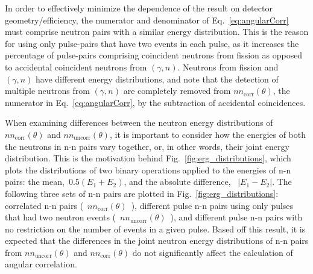 In order to effectively minimize the dependence of the result on detector geometry/efficiency, the numerator and denominator of Eq.~\ref{eq:angularCorr} must comprise neutron pairs with a similar energy distribution.
This is the reason for using only pulse-pairs that have two events in each pulse, as it increases the percentage of pulse-pairs comprising coincident neutrons from fission as opposed to accidental coincident neutrons from $(\gamma,n)$.
Neutrons from fission and $(\gamma,n)$ have different energy distributions, and note that the detection of multiple neutrons from $(\gamma,n)$ are completely removed from $nn_{\text{corr}}(\theta)$, the numerator in Eq.~\ref{eq:angularCorr}, by the subtraction of accidental coincidences.

When examining differences between the neutron energy distributions of $nn_{\text{corr}}(\theta)$ and $nn_{\text{uncorr}}(\theta)$, it is important to consider how the energies of both the neutrons in n-n pairs vary together, or, in other words, their joint energy distribution.
This is the motivation behind Fig.~\ref{fig:erg_distributions}, which plots the distributions of two binary operations applied to the energies of n-n pairs: the mean,~$0.5(E_{1} + E_{2})$, and the absolute difference, ~$|E_1 - E_2|$.
The following three sets of n-n pairs are plotted in Fig.~\ref{fig:erg_distributions}: correlated n-n pairs (~$nn_{\text{corr}}(\theta)$~), different pulse n-n pairs using only pulses that had two neutron events (~$nn_{\text{uncorr}}(\theta)$~), and different pulse n-n pairs with no restriction on the number of events in a given pulse.
Based off this result, it is expected that the differences in the joint neutron energy distributions of n-n pairs from $nn_{\text{uncorr}}(\theta)$ and $nn_{\text{corr}}(\theta)$ do not significantly affect the calculation of angular correlation.

